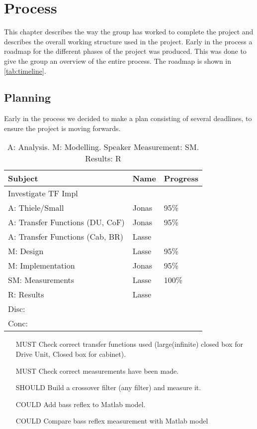 
\chapter{Process}
This chapter describes the way the group has worked to complete the project and describes the overall working structure used in the project.
Early in the process a roadmap for the different phases of the project was produced. This was done to give the group an overview of the entire process. The roadmap is shown in \cref{tab:timeline}.

\section{Planning}
Early in the process we decided to make a plan consisting of several deadlines, to ensure the project is moving forwards.

\begin{table}
	\begin{tabularx}{\textwidth}{l X X}
		\toprule
		\textbf{Subject} & \textbf{Name} & \textbf{Progress} \\
		\midrule
		Investigate TF Impl & & \\
		A: Thiele/Small & Jonas & 95\% \\
		A: Transfer Functions (DU, CoF) & Jonas & 95\%\\
		A: Transfer Functions (Cab, BR) & Lasse & \\
		M: Design & Lasse & 95\% \\
		M: Implementation & Jonas & 95\% \\
		SM: Measurements & Lasse & 100\% \\
		R: Results & Lasse & \\
		Disc: & & \\
		Conc: & & \\
		\bottomrule
	\end{tabularx}
	\caption{A: Analysis. M: Modelling. Speaker Measurement: SM. Results: R}
\end{table}

\begin{itemize}
	\item[MUST] Check correct transfer functions used (large(infinite) closed box for Drive Unit, Closed box for cabinet).
	\item[MUST] Check correct measurements have been made.
	\item[SHOULD] Build a crossover filter (any filter) and measure it.
	\item[COULD] Add bass reflex to Matlab model.
	\item[COULD] Compare bass reflex measurement with Matlab model
\end{itemize}